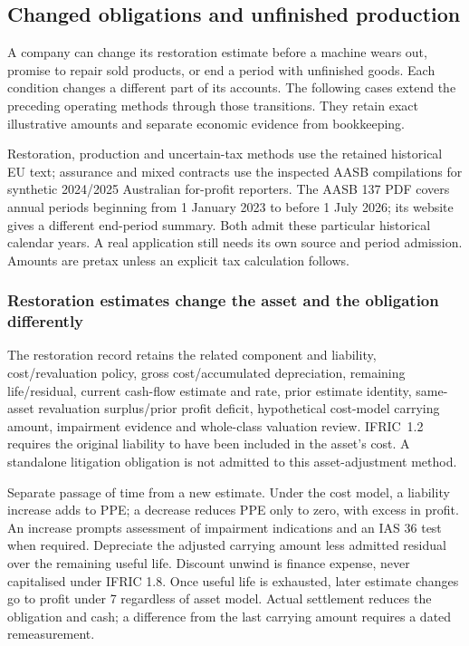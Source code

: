 \hypertarget{sec:corporate-residuals}{%
\subsection{Changed obligations and unfinished production}\label{sec:corporate-residuals}}

A company can change its restoration estimate before a machine wears out, promise to repair sold products, or end a period with unfinished goods. Each condition changes a different part of its accounts. The following cases extend the preceding operating methods through those transitions. They retain exact illustrative amounts and separate economic evidence from bookkeeping.

Restoration, production and uncertain-tax methods use the retained historical EU text; assurance and mixed contracts use the inspected AASB compilations for synthetic 2024/2025 Australian for-profit reporters. The AASB 137 PDF covers annual periods beginning from 1 January 2023 to before 1 July 2026; its website gives a different end-period summary. Both admit these particular historical calendar years. A real application still needs its own source and period admission. Amounts are pretax unless an explicit tax calculation follows.

\hypertarget{restoration-estimates-change-the-asset-and-the-obligation-differently}{%
\subsubsection{Restoration estimates change the asset and the obligation differently}\label{restoration-estimates-change-the-asset-and-the-obligation-differently}}

The restoration record retains the related component and liability, cost/revaluation policy, gross cost/accumulated depreciation, remaining life/residual, current cash-flow estimate and rate, prior estimate identity, same-asset revaluation surplus/prior profit deficit, hypothetical cost-model carrying amount, impairment evidence and whole-class valuation review. IFRIC~1.2 \citep[IFRIC~1.1--8]{eu20231803} requires the original liability to have been included in the asset's cost. A standalone litigation obligation is not admitted to this asset-adjustment method.

Separate passage of time from a new estimate. Under the cost model, a liability increase adds to PPE; a decrease reduces PPE only to zero, with excess in profit. An increase prompts assessment of impairment indications and an IAS 36 test when required. Depreciate the adjusted carrying amount less admitted residual over the remaining useful life. Discount unwind is finance expense, never capitalised under IFRIC 1.8. Once useful life is exhausted, later estimate changes go to profit under 7 regardless of asset model. Actual settlement reduces the obligation and cash; a difference from the last carrying amount requires a dated remeasurement.


